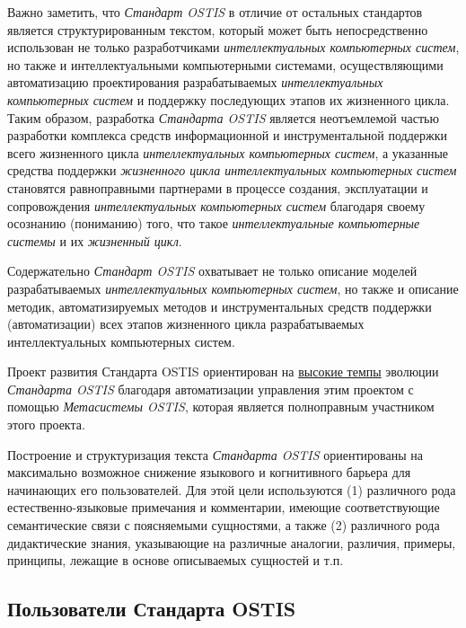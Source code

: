 Важно заметить, что \textit{Стандарт OSTIS} в отличие от остальных стандартов является структурированным  текстом, который может быть непосредственно использован не только разработчиками \textit{интеллектуальных компьютерных систем}, но также и интеллектуальными компьютерными системами, осуществляющими автоматизацию проектирования разрабатываемых \textit{интеллектуальных компьютерных систем} и поддержку последующих этапов их жизненного цикла. Таким образом, разработка \textit{Стандарта OSTIS} является неотъемлемой частью разработки комплекса средств информационной и инструментальной поддержки всего жизненного цикла \textit{интеллектуальных компьютерных систем}, а указанные средства поддержки \textit{жизненного цикла интеллектуальных компьютерных систем} становятся равноправными партнерами в процессе создания, эксплуатации и сопровождения \textit{интеллектуальных компьютерных систем} благодаря своему осознанию (пониманию) того, что такое \textit{интеллектуальные компьютерные системы} и их \textit{жизненный цикл}.

Содержательно \textit{Стандарт OSTIS} охватывает не только описание моделей разрабатываемых \textit{интеллектуальных компьютерных систем}, но также и описание методик, автоматизируемых методов и инструментальных средств поддержки (автоматизации) всех этапов жизненного цикла разрабатываемых интеллектуальных компьютерных систем.

Проект развития Стандарта OSTIS ориентирован на \uline{высокие темпы} эволюции \textit{Стандарта OSTIS} благодаря автоматизации управления этим проектом с помощью \textit{Метасистемы OSTIS}, которая является полноправным участником этого проекта.

Построение и структуризация текста \textit{Стандарта OSTIS} ориентированы на максимально возможное снижение языкового и когнитивного барьера для начинающих его пользователей. Для этой цели используются (1) различного рода естественно-языковые примечания и комментарии, имеющие соответствующие семантические связи с поясняемыми сущностями, а также (2) различного рода дидактические знания, указывающие на различные аналогии, различия, примеры, принципы, лежащие в основе описываемых сущностей и т.п.


\subsection{Пользователи Стандарта OSTIS}

